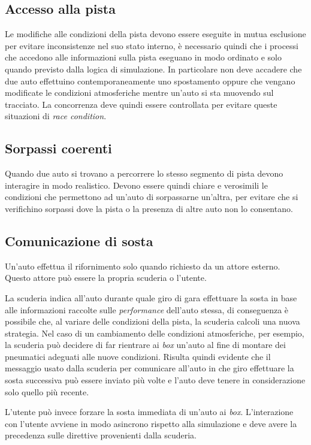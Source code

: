 \documentclass[a4paper]{report}
\begin{document}
\subsection*{Accesso alla pista}
Le modifiche alle condizioni della pista devono essere eseguite in mutua esclusione per evitare inconsistenze nel suo stato interno, è necessario quindi che i processi che accedono alle informazioni sulla pista eseguano in modo ordinato e solo quando previsto dalla logica di simulazione. In particolare non deve accadere che due auto effettuino contemporaneamente uno spostamento oppure che vengano modificate le condizioni atmosferiche mentre un'auto si sta muovendo sul tracciato.
La concorrenza deve quindi essere controllata per evitare queste situazioni di \textit{race condition}.

\subsection*{Sorpassi coerenti}
Quando due auto si trovano a percorrere lo stesso segmento di pista devono interagire in modo realistico. Devono essere quindi chiare e verosimili le condizioni che permettono ad un'auto di sorpassarne un'altra, per evitare che si verifichino sorpassi dove la pista o la presenza di altre auto non lo consentano.

\subsection*{Comunicazione di sosta}
Un'auto effettua il rifornimento solo quando richiesto da un attore esterno. Questo attore può essere la propria scuderia o l'utente.

La scuderia indica all'auto durante quale giro di gara effettuare la sosta in base alle informazioni raccolte sulle \textit{performance} dell'auto stessa, di conseguenza è possibile che, al variare delle condizioni della pista, la scuderia calcoli una nuova strategia. Nel caso di un cambiamento delle condizioni atmosferiche, per esempio, la scuderia può decidere di far rientrare ai \textit{box} un'auto al fine di montare dei pneumatici adeguati alle nuove condizioni. Risulta quindi evidente che il messaggio usato dalla scuderia per comunicare all'auto in che giro effettuare la sosta successiva può essere inviato più volte e l'auto deve tenere in considerazione solo quello più recente.

L'utente può invece forzare la sosta immediata di un'auto ai \textit{box}. L'interazione con l'utente avviene in modo asincrono rispetto alla simulazione e deve avere la precedenza sulle direttive provenienti dalla scuderia.
\end{document}
